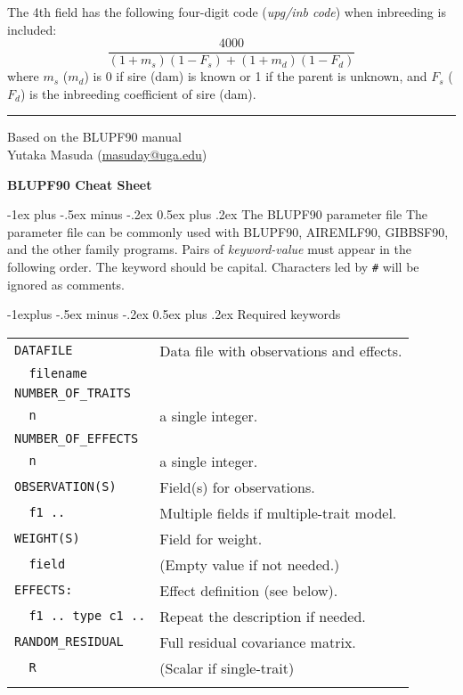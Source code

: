 \documentclass[10pt,landscape]{article}
\makeatletter
\renewcommand{\section}{\@startsection{section}{1}{0mm}%
                                {-1ex plus -.5ex minus -.2ex}%
                                {0.5ex plus .2ex}%
                                {\normalfont\large\bfseries}}
\renewcommand{\subsection}{\@startsection{subsection}{2}{0mm}%
                                {-1explus -.5ex minus -.2ex}%
                                {0.5ex plus .2ex}%
                                {\normalfont\normalsize\bfseries}}
\makeatother
\begin{document}
\begin{multicols}{3}
The 4th field has the following four-digit code (\emph{upg/inb code}) when inbreeding is included:
\[
\frac{4000}{(1+m_s)(1-F_s) + (1+m_d)(1-F_d)}
\]
where $m_s$ ($m_d$) is 0 if sire (dam) is known or 1 if the parent is unknown, and $F_s$ ($F_d$) is the inbreeding coefficient of sire (dam).

\rule{0.3\linewidth}{0.25pt}
\scriptsize

Based on the BLUPF90 manual\\
Yutaka Masuda (\href{mailto:masuday@uga.edu}{masuday@uga.edu})

\clearpage
\footnotesize

\begin{center}
     \Large{\textbf{BLUPF90 Cheat Sheet}} \\
\end{center}

\section{The BLUPF90 parameter file}
The parameter file can be commonly used with BLUPF90, AIREMLF90, GIBBSF90, and the other family programs.
Pairs of \emph{keyword-value} must appear in the following order.
The keyword should be capital.
Characters led by \verb|#| will be ignored as comments.

\subsection{Required keywords}
\begin{tabular}{@{}ll@{}}
  \verb|DATAFILE|    & Data file with observations and effects.\\
  \verb|  filename|  & \\
  \verb|NUMBER_OF_TRAITS|    & \\
  \verb|  n|   & a single integer.\\
  \verb|NUMBER_OF_EFFECTS|    & \\
  \verb|  n|   & a single integer.\\
  \verb|OBSERVATION(S)| & Field(s) for observations.\\
  \verb|  f1 ..|   & Multiple fields if multiple-trait model.\\
  \verb|WEIGHT(S)| & Field for weight.\\
  \verb|  field|   & (Empty value if not needed.)\\
  \verb|EFFECTS:| & Effect definition (see below).\\
  \verb|  f1 .. type c1 ..| & Repeat the description if needed.\\
  \verb|RANDOM_RESIDUAL| & Full residual covariance matrix.\\
  \verb|  R|       & (Scalar if single-trait)\\
\\
\end{tabular}


\end{multicols}
\end{document}
